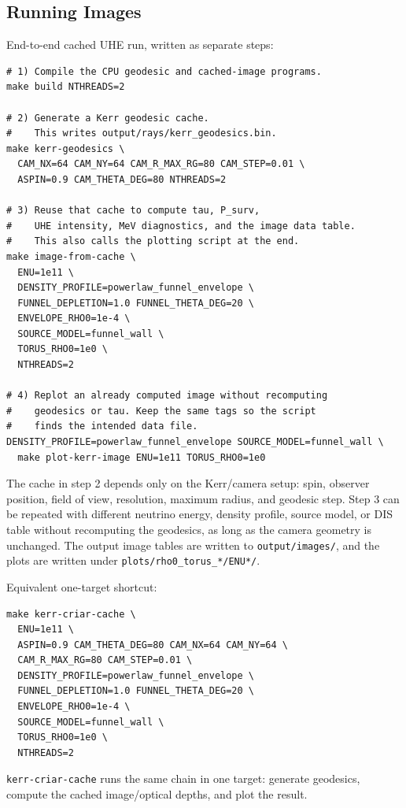 \documentclass[11pt,a4paper]{article}
\begin{document}
\subsection{Running Images}

End-to-end cached UHE run, written as separate steps:

\begin{verbatim}
# 1) Compile the CPU geodesic and cached-image programs.
make build NTHREADS=2

# 2) Generate a Kerr geodesic cache.
#    This writes output/rays/kerr_geodesics.bin.
make kerr-geodesics \
  CAM_NX=64 CAM_NY=64 CAM_R_MAX_RG=80 CAM_STEP=0.01 \
  ASPIN=0.9 CAM_THETA_DEG=80 NTHREADS=2

# 3) Reuse that cache to compute tau, P_surv,
#    UHE intensity, MeV diagnostics, and the image data table.
#    This also calls the plotting script at the end.
make image-from-cache \
  ENU=1e11 \
  DENSITY_PROFILE=powerlaw_funnel_envelope \
  FUNNEL_DEPLETION=1.0 FUNNEL_THETA_DEG=20 \
  ENVELOPE_RHO0=1e-4 \
  SOURCE_MODEL=funnel_wall \
  TORUS_RHO0=1e0 \
  NTHREADS=2

# 4) Replot an already computed image without recomputing
#    geodesics or tau. Keep the same tags so the script
#    finds the intended data file.
DENSITY_PROFILE=powerlaw_funnel_envelope SOURCE_MODEL=funnel_wall \
  make plot-kerr-image ENU=1e11 TORUS_RHO0=1e0
\end{verbatim}

The cache in step 2 depends only on the Kerr/camera setup: spin, observer
position, field of view, resolution, maximum radius, and geodesic step. Step 3
can be repeated with different neutrino energy, density profile, source model,
or DIS table without recomputing the geodesics, as long as the camera geometry
is unchanged. The output image tables are written to \texttt{output/images/},
and the plots are written under \texttt{plots/rho0\_torus\_*/ENU*/}.

Equivalent one-target shortcut:

\begin{verbatim}
make kerr-criar-cache \
  ENU=1e11 \
  ASPIN=0.9 CAM_THETA_DEG=80 CAM_NX=64 CAM_NY=64 \
  CAM_R_MAX_RG=80 CAM_STEP=0.01 \
  DENSITY_PROFILE=powerlaw_funnel_envelope \
  FUNNEL_DEPLETION=1.0 FUNNEL_THETA_DEG=20 \
  ENVELOPE_RHO0=1e-4 \
  SOURCE_MODEL=funnel_wall \
  TORUS_RHO0=1e0 \
  NTHREADS=2
\end{verbatim}

\texttt{kerr-criar-cache} runs the same chain in one target: generate
geodesics, compute the cached image/optical depths, and plot the result.
\end{document}
